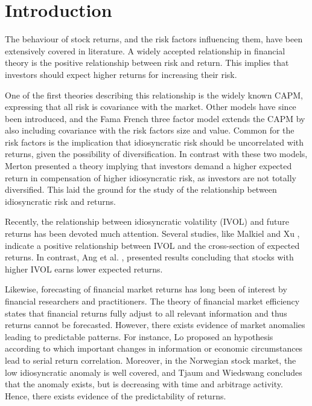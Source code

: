 \chapter{Introduction}
The behaviour of stock returns, and the risk factors influencing them, have been extensively covered in literature. A widely accepted relationship in financial theory is the positive relationship between risk and return. This implies that investors should expect higher returns for increasing their risk.

One of the first theories describing this relationship is the widely known CAPM, expressing that all risk is covariance with the market. Other models have since been introduced, and the Fama French three factor model \cite{famafrench} extends the CAPM by also including covariance with the risk factors size and value. Common for the risk factors is the implication that idiosyncratic risk should be uncorrelated with returns, given the possibility of diversification. In contrast with these two models, Merton \cite{merton87} presented a theory implying that investors demand a higher expected return in compensation of higher idiosyncratic risk, as investors are not totally diversified. This laid the ground for the study of the relationship between idiosyncratic risk and returns.

Recently, the relationship between idiosyncratic volatility (IVOL) and future returns has been devoted much attention. Several studies, like Malkiel and Xu \cite{malkielxu02}, indicate a positive relationship between IVOL and the cross-section of expected returns. In contrast, Ang et al. \cite{angetal06}, presented results concluding that stocks with higher IVOL earns lower expected returns.

Likewise, forecasting of financial market returns has long been of interest by financial researchers and practitioners. The theory of financial market efficiency states that financial returns fully adjust to all relevant information and thus returns cannot be forecasted. However, there exists evidence of market anomalies leading to predictable patterns. For instance, Lo \cite{Lo} proposed an hypothesis according to which important changes in information or economic circumstances lead to serial return correlation. Moreover, in the Norwegian stock market, the low idiosyncratic anomaly is well covered, and Tjaum and Wiedswang \cite{thaumwiedswang} concludes that the anomaly exists, but is decreasing with time and arbitrage activity. Hence, there exists evidence of the predictability of returns.

